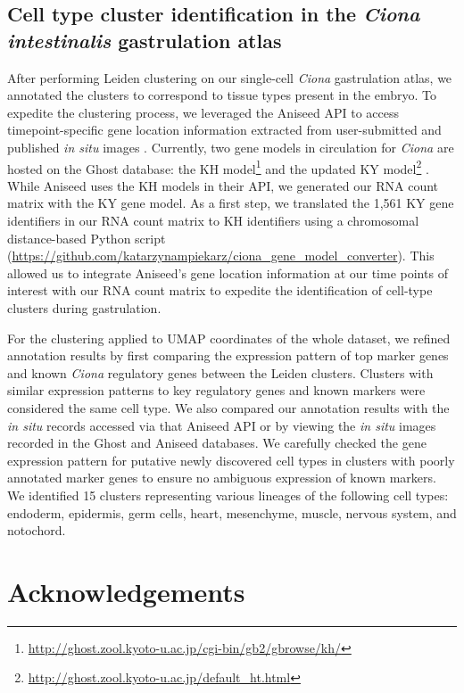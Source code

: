 \subsection{Cell type cluster identification in the \textit{Ciona intestinalis} gastrulation atlas}
After performing Leiden clustering on our single-cell \textit{Ciona} gastrulation atlas, we annotated the clusters to correspond to tissue types present in the embryo. To expedite the clustering process, we leveraged the Aniseed API to access timepoint-specific gene location information extracted from user-submitted and published \textit{in situ} images \cite{dardaillon2020}. Currently, two gene models in circulation for \textit{Ciona} are hosted on the Ghost database: the KH model\footnote{\url{http://ghost.zool.kyoto-u.ac.jp/cgi-bin/gb2/gbrowse/kh/}} and the updated KY model\footnote{\url{http://ghost.zool.kyoto-u.ac.jp/default_ht.html}} \cite{dehal2002,satou2019,imai2004}. While Aniseed uses the KH models in their API, we generated our RNA count matrix with the KY gene model. As a first step, we translated the 1,561 KY gene identifiers in our RNA count matrix to KH identifiers using a chromosomal distance-based Python script (\url{https://github.com/katarzynampiekarz/ciona_gene_model_converter}). This allowed us to integrate Aniseed's gene location information at our time points of interest with our RNA count matrix to expedite the identification of cell-type clusters during gastrulation. 

For the clustering applied to UMAP coordinates of the whole dataset, we refined annotation results by first comparing the expression pattern of top marker genes and known \textit{Ciona} regulatory genes between the Leiden clusters. Clusters with similar expression patterns to key regulatory genes and known markers were considered the same cell type. We also compared our annotation results with the \textit{in situ} records accessed via that Aniseed API or by viewing the \textit{in situ} images recorded in the Ghost and Aniseed databases. We carefully checked the gene expression pattern for putative newly discovered cell types in clusters with poorly annotated marker genes to ensure no ambiguous expression of known markers. We identified 15 clusters representing various lineages of the following cell types: endoderm, epidermis, germ cells, heart, mesenchyme, muscle, nervous system, and notochord.

\section{Acknowledgements}

